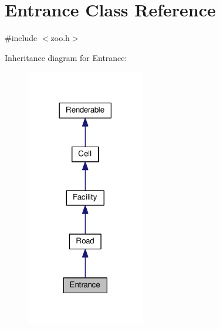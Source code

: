 \hypertarget{classEntrance}{}\section{Entrance Class Reference}
\label{classEntrance}


{\ttfamily \#include $<$zoo.\+h$>$}



Inheritance diagram for Entrance\+:
\nopagebreak
\begin{figure}[H]
\begin{center}
\leavevmode
\includegraphics[width=146pt]{classEntrance__inherit__graph}
\end{center}
\end{figure}


